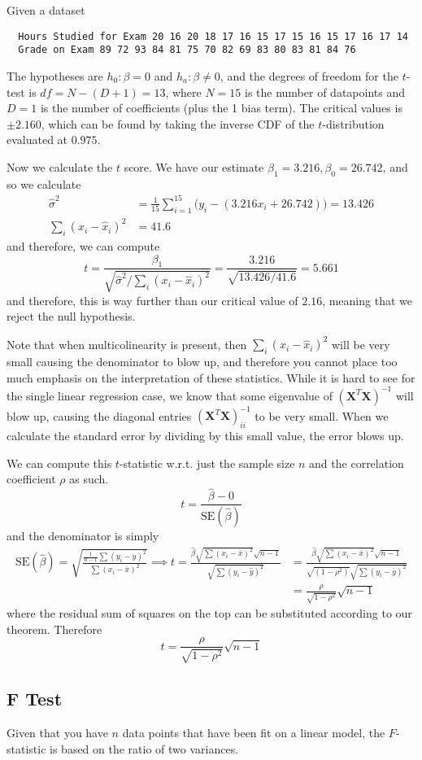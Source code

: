   \begin{example}
  Given a dataset 
  \begin{verbatim}
  Hours Studied for Exam 20 16 20 18 17 16 15 17 15 16 15 17 16 17 14
  Grade on Exam 89 72 93 84 81 75 70 82 69 83 80 83 81 84 76
  \end{verbatim}
  The hypotheses are $h_0 : \beta = 0$ and $h_a : \beta \neq 0$, and the degrees of freedom for the $t$-test is $df = N - (D + 1) = 13$, where $N = 15$ is the number of datapoints and $D = 1$ is the number of coefficients (plus the 1 bias term). The critical values is $\pm 2.160$, which can be found by taking the inverse CDF of the $t$-distribution evaluated at $0.975$. 

  Now we calculate the $t$ score. We have our estimate $\beta_1 = 3.216, \beta_0 = 26.742$, and so we calculate 
  \begin{align*}
      \hat{\sigma}^2 & = \frac{1}{15} \sum_{i=1}^{15} \big( y_i - (3.216 x_i + 26.742) \big) = 13.426 \\
      \sum_{i} (x_i - \hat{x}_i)^2 & = 41.6 
  \end{align*}
  and therefore, we can compute 
  \[t = \frac{\beta_1}{\sqrt{\hat{\sigma}^2 /  \sum_{i} (x_i - \hat{x}_i)^2}} = \frac{3.216}{\sqrt{13.426/41.6}} = 5.661\]
  and therefore, this is way further than our critical value of $2.16$, meaning that we reject the null hypothesis. 
  \end{example}

  Note that when multicolinearity is present, then $\sum_{i} (x_i - \hat{x}_i)^2$ will be very small causing the denominator to blow up, and therefore you cannot place too much emphasis on the interpretation of these statistics. While it is hard to see for the single linear regression case, we know that some eigenvalue of $(\mathbf{X}^T \mathbf{X})^{-1}$ will blow up, causing the diagonal entries $(\mathbf{X}^T \mathbf{X})^{-1}_{ii}$ to be very small. When we calculate the standard error by dividing by this small value, the error blows up. 

  \begin{theorem}
  We can compute this $t$-statistic w.r.t. just the sample size $n$ and the correlation coefficient $\rho$ as such. 
  \[t = \frac{\hat{\beta} - 0}{\mathrm{SE}(\hat{\beta})}\]
  and the denominator is simply 
  \begin{align*}
    \mathrm{SE}(\hat{\beta}) = \sqrt{\frac{\frac{1}{n-1} \sum (y_i - \hat{y})^2}{\sum (x_i - \bar{x})^2}} \implies t = \frac{\hat{\beta} \sqrt{\sum (x_i - \bar{x})^2} \sqrt{n-1}}{\sqrt{\sum (y_i - \hat{y})^2}} & = \frac{\hat{\beta} \sqrt{\sum (x_i - \bar{x})^2} \sqrt{n-1}}{\sqrt{(1 - \rho^2)} \sqrt{\sum (y_i - \bar{y})^2}} \\ & = \frac{\rho}{\sqrt{1 - \rho^2}} \sqrt{n-1}
  \end{align*}
  where the residual sum of squares on the top can be substituted according to our theorem. Therefore 
  \begin{equation}
    t = \frac{\rho}{\sqrt{1 - \rho^2}} \sqrt{n-1}
  \end{equation}
  \end{theorem}

\subsection{F Test}

  Given that you have $n$ data points that have been fit on a linear model, the $F$-statistic is based on the ratio of two variances. 

